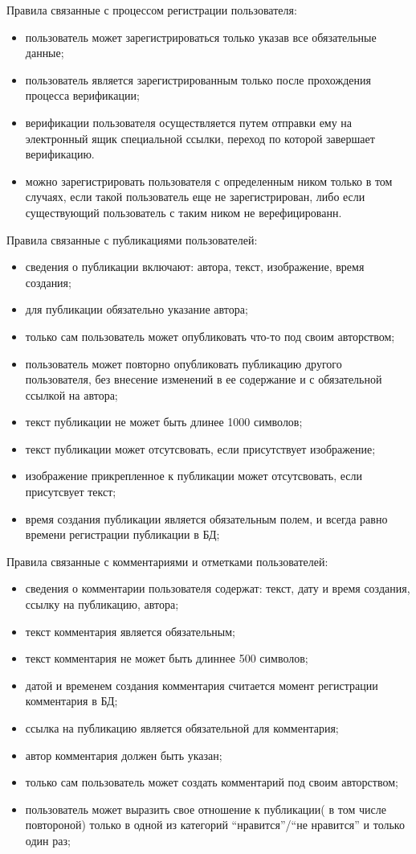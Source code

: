 Правила связанные с процессом регистрации пользователя:
\begin{itemize}
\item пользователь может зарегистрироваться только указав все обязательные данные;
\item пользователь является зарегистрированным только после прохождения процесса верификации;
\item верификации пользователя осуществляется путем отправки ему на электронный ящик специальной ссылки,
  переход по которой завершает верификацию.
\item можно зарегистрировать пользователя с определенным ником только в том случаях, если такой пользователь
  еще не зарегистрирован, либо если существующий пользователь с таким ником не верефицированн.
\end{itemize}

Правила связанные с публикациями пользователей:
\begin{itemize}
\item сведения о публикации включают: автора, текст, изображение, время создания;
\item для публикации обязательно указание автора;
\item только сам пользователь может опубликовать что-то под своим авторством;
\item пользователь может повторно опубликовать публикацию другого пользователя, без внесение изменений в
  ее содержание и с обязательной ссылкой на автора;
\item текст публикации не может быть длинее 1000 символов;
\item текст публикации может отсутсвовать, если присутствует изображение;
\item изображение прикрепленное к публикации может отсутсвовать, если присутсвует текст;
\item время создания публикации является обязательным полем, и всегда равно времени регистрации публикации в БД;
\end{itemize}

Правила связанные с комментариями и отметками пользователей:
\begin{itemize}
\item сведения о комментарии пользователя содержат: текст, дату и время создания, ссылку на публикацию, автора;
\item текст комментария является обязательным;
\item текст комментария не может быть длиннее 500 символов;
\item датой и временем создания комментария считается момент регистрации комментария в БД;
\item ссылка на публикацию является обязательной для комментария;
\item автор комментария должен быть указан;
\item только сам пользователь может создать комментарий под своим авторством;
\item пользователь может выразить свое отношение к публикации( в том числе повтороной) только в одной
  из категорий ``нравится''/``не нравится'' и только один раз;
\end{itemize}


